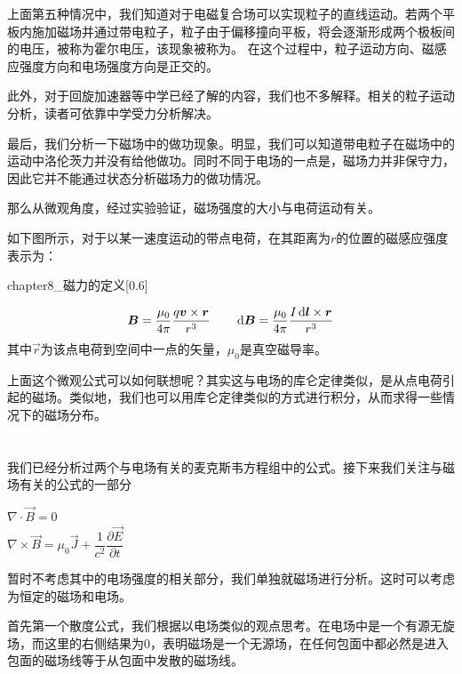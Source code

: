上面第五种情况中，我们知道对于电磁复合场可以实现粒子的直线运动。若两个平板内施加磁场并通过带电粒子，粒子由于偏移撞向平板，将会逐渐形成两个极板间的电压，被称为霍尔电压，该现象被称为。
在这个过程中，粒子运动方向、磁感应强度方向和电场强度方向是正交的。

此外，对于回旋加速器等中学已经了解的内容，我们也不多解释。相关的粒子运动分析，读者可依靠中学受力分析解决。

最后，我们分析一下磁场中的做功现象。明显，我们可以知道带电粒子在磁场中的运动中洛伦茨力并没有给他做功。同时不同于电场的一点是，磁场力并非保守力，因此它并不能通过状态分析磁场力的做功情况。

那么从微观角度，经过实验验证，磁场强度的大小与电荷运动有关。
\begin{law}
    如下图所示，对于以某一速度运动的带点电荷，在其距离为$r$的位置的磁感应强度表示为：
    \begin{singlefigure}[电流产生的磁场]{chapter8_磁力的定义}[0.6]
    \end{singlefigure}
    \vspace{-5mm}
    \[\vec{B} = \dfrac{\mu_0}{4\pi}\dfrac{q\vec{v}\times\vec{r}}{r^3}\qquad \dif \vec{B} = \dfrac{\mu_0}{4\pi}\dfrac{I\dif\vec{l}\times\vec{r}}{r^3}\]
    其中$\vec{r}$为该点电荷到空间中一点的矢量，$\mu_0$是真空磁导率。
\end{law}

上面这个微观公式可以如何联想呢？其实这与电场的库仑定律类似，是从点电荷引起的磁场。类似地，我们也可以用库仑定律类似的方式进行积分，从而求得一些情况下的磁场分布。
\section[安培定律]{}
我们已经分析过两个与电场有关的麦克斯韦方程组中的公式。接下来我们关注与磁场有关的公式的一部分
\begin{center}
    $\nabla \cdot \vec{B} = 0$\\
    $\nabla \times \vec{B} = \mu_0\vec{J}+\dfrac{1}{c^2}\dfrac{\partial \vec{E}}{\partial t}$
\end{center}

暂时不考虑其中的电场强度的相关部分，我们单独就磁场进行分析。这时可以考虑为恒定的磁场和电场。

首先第一个散度公式，我们根据以电场类似的观点思考。在电场中是一个有源无旋场，而这里的右侧结果为0，表明磁场是一个无源场，在任何包面中都必然是进入包面的磁场线等于从包面中发散的磁场线。

